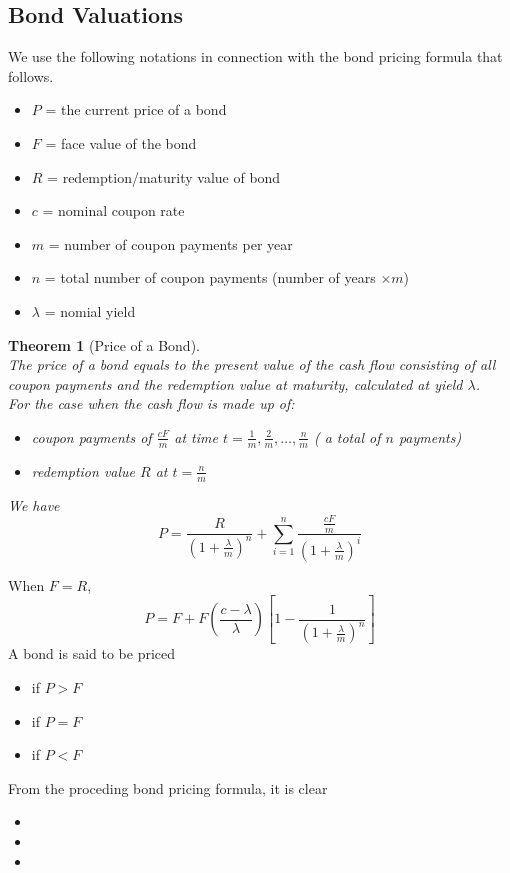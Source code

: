 \documentclass[12pt]{article}
\newtheorem{theorem}{Theorem}[section]
\theoremstyle{definition}
\begin{document}
\subsection{Bond Valuations}
We use the following notations in connection with the bond pricing formula that follows.
\begin{itemize}
  \item $P$ = the current price of a bond
  \item $F$ = face value of the bond
  \item $R$ = redemption/maturity value of bond
  \item $c$ = nominal coupon rate
  \item $m$ = number of coupon payments per year
  \item $n$ = total number of coupon payments (number of years $\times m$)
  \item $\lambda$ = nomial yield
\end{itemize}
\begin{theorem}[Price of a Bond]
\hfill\\\normalfont
The price of a bond equals to the present value of the cash flow consisting of all coupon payments and the redemption value at maturity, calculated at yield $\lambda$.\\
For the case when the cash flow is made up of:
\begin{itemize}
  \item coupon payments of $\frac{cF}{m}$ at time $t=\frac{1}{m},\frac{2}{m},\ldots, \frac{n}{m}$ ( a total of $n$ payments)
  \item redemption value $R$ at $t = \frac{n}{m}$
\end{itemize}
We have
\[
P=\frac{R}{\left(1+\frac{\lambda}{m}\right)^n}+\sum_{i=1}^n\frac{\frac{cF}{m}}{\left(1+\frac{\lambda}{m}\right)^i}
\]
\end{theorem}
When $F=R$,
\[
P = F+F\left(\frac{c-\lambda}{\lambda}\right)\left[1-\frac{1}{\left(1+\frac{\lambda}{m}\right)^n}\right]
\]
A bond is said to be priced
\begin{itemize}
  \item{ if $P>F$}
  \item{ if $P=F$}
  \item{ if $P<F$}
\end{itemize}
From the proceding bond pricing formula, it is clear
\begin{itemize}
  \item {}
  \item {}
  \item {}
\end{itemize}
\end{document}
